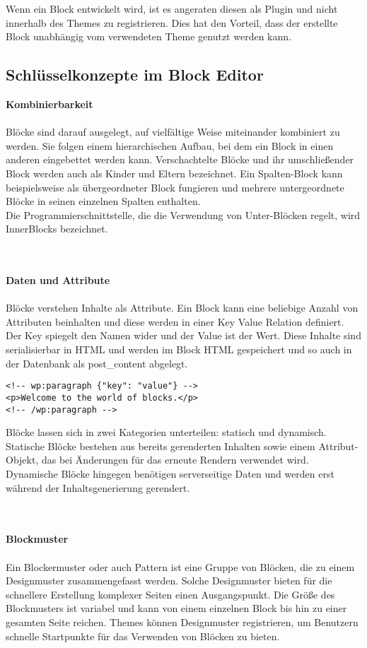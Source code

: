 Wenn ein Block entwickelt wird, ist es angeraten diesen als \gls{Plugin} und nicht innerhalb des Themes zu registrieren.
Dies hat den Vorteil, dass der erstellte Block unabhängig vom verwendeten Theme genutzt werden kann.
\newpage
\subsection{Schlüsselkonzepte im Block Editor}
\textbf{Kombinierbarkeit}
\\\\
Blöcke sind darauf ausgelegt, auf vielfältige Weise miteinander kombiniert zu werden.
Sie folgen einem hierarchischen Aufbau, bei dem ein Block in einen anderen eingebettet werden kann.
Verschachtelte Blöcke und ihr umschließender Block werden auch als Kinder und Eltern bezeichnet.
Ein Spalten-Block kann beispielsweise als übergeordneter Block fungieren und mehrere untergeordnete Blöcke in seinen einzelnen Spalten enthalten.
\\
Die Programmierschnittstelle, die die Verwendung von Unter-Blöcken regelt, wird InnerBlocks bezeichnet.


\\\\
\textbf{Daten und Attribute}
\\\\
Blöcke verstehen Inhalte als Attribute.
Ein Block kann eine beliebige Anzahl von Attributen beinhalten und diese werden in einer Key Value Relation definiert.
Der Key spiegelt den Namen wider und der Value ist der Wert.
Diese Inhalte sind serialisierbar in HTML und werden im Block HTML gespeichert und so auch in der Datenbank als post\_content abgelegt.

\begin{lstlisting}[caption={Beispiel eines Gutenberg-Blocks in WordPress}]
<!-- wp:paragraph {"key": "value"} -->
<p>Welcome to the world of blocks.</p>
<!-- /wp:paragraph -->
\end{lstlisting}

Blöcke lassen sich in zwei Kategorien unterteilen: statisch und dynamisch.
Statische Blöcke bestehen aus bereits gerenderten Inhalten sowie einem Attribut-Objekt, das bei Änderungen für das erneute Rendern verwendet wird.
Dynamische Blöcke hingegen benötigen serverseitige Daten und werden erst während der Inhaltsgenerierung gerendert.




\\\\
\textbf{Blockmuster}
\\\\
Ein Blockermuster oder auch Pattern ist eine Gruppe von Blöcken, die zu einem Designmuster zusammengefasst werden.
Solche Designmuster bieten für die schnellere Erstellung komplexer Seiten einen Ausgangspunkt.
Die Größe des Blockmusters ist variabel und kann von einem einzelnen Block bis hin zu einer gesamten Seite reichen.
Themes können Designmuster registrieren, um Benutzern schnelle Startpunkte für das Verwenden von Blöcken zu bieten.

